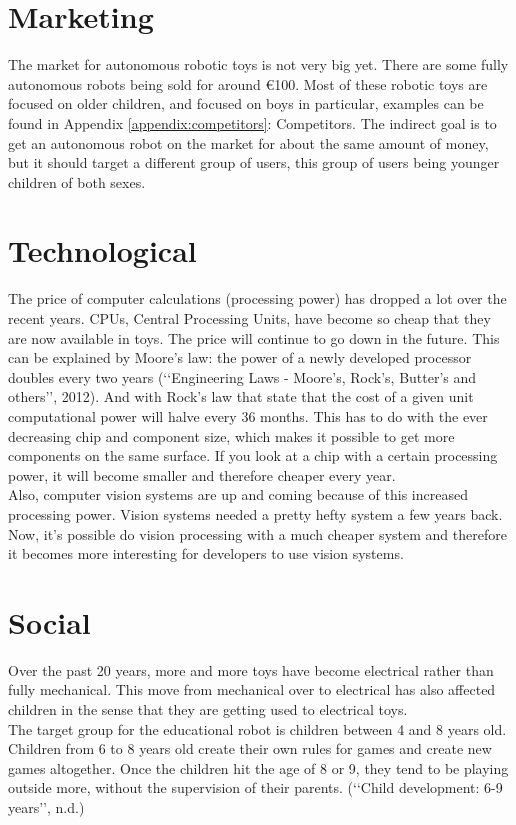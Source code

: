 \documentclass[11pt,twoside,a4paper]{report}
\begin{document}
\section{Marketing}
The market for autonomous robotic toys is not very big yet. There are some fully autonomous robots being sold for around \euro{}100. Most of these robotic toys are focused on older children, and focused on boys in particular, examples can be found in Appendix \ref{appendix:competitors}: Competitors. The indirect goal is to get an autonomous robot on the market for about the same amount of money, but it should target a different group of users, this group of users being younger children of both sexes.
\section{Technological}
The price of computer calculations (processing power) has dropped a lot over the recent years. CPUs, Central Processing Units, have become so cheap that they are now available in toys. The price will continue to go down in the future. This can be explained by Moore\rq{}s law: the power of a newly developed processor doubles every two years (\lq\lq{}Engineering Laws - Moore\rq{}s, Rock\rq{}s, Butter\rq{}s and others\rq\rq{}, 2012). And with Rock\rq{}s law that state that the cost of a given unit computational power will halve every 36 months. This has to do with the ever decreasing chip and component size, which makes it possible to get more components on the same surface. If you look at a chip with a certain processing power, it will become smaller and therefore cheaper every year. \\
Also, computer vision systems are up and coming because of this increased processing power. Vision systems needed a pretty hefty system a few years back. Now, it\rq{}s possible do vision processing with a much cheaper system and therefore it becomes more interesting for developers to use vision systems.
\section{Social}

Over the past 20 years, more and more toys have become electrical rather than fully mechanical. This move from mechanical over to electrical has also affected children in the sense that they are getting used to electrical toys. \\
The target group for the educational robot is children between 4 and 8 years old. Children from 6 to 8 years old create their own rules for games and create new games altogether. Once the children hit the age of 8 or 9, they tend to be playing outside more, without the supervision of their parents. (\lq\lq{}Child development: 6-9 years\rq\rq{}, n.d.)
\end{document}
